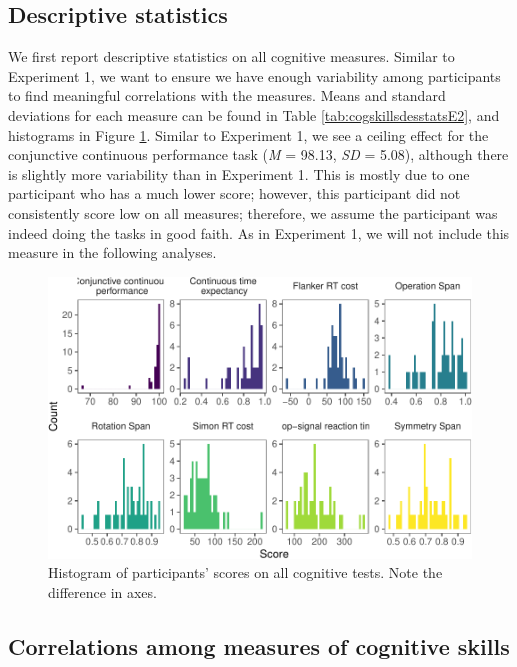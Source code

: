 \documentclass[
  man,floatsintext]{apa6}
\begin{document}
\hypertarget{descriptive-statistics-1}{%
\subsection{Descriptive statistics}\label{descriptive-statistics-1}}

We first report descriptive statistics on all cognitive measures. Similar to Experiment 1, we want to ensure we have enough variability among participants to find meaningful correlations with the measures. Means and standard deviations for each measure can be found in Table \ref{tab:cogskillsdesstatsE2}, and histograms in Figure \ref{fig:exp2hist}. Similar to Experiment 1, we see a ceiling effect for the conjunctive continuous performance task (\emph{M} = 98.13, \emph{SD} = 5.08), although there is slightly more variability than in Experiment 1. This is mostly due to one participant who has a much lower score; however, this participant did not consistently score low on all measures; therefore, we assume the participant was indeed doing the tasks in good faith. As in Experiment 1, we will not include this measure in the following analyses.



\begin{figure}
\centering
\includegraphics{task_difficulty_ind_dif_files/figure-latex/exp2hist-1.pdf}
\caption{\label{fig:exp2hist}Histogram of participants' scores on all cognitive tests. Note the difference in axes.}
\end{figure}

\hypertarget{correlations-among-measures-of-cognitive-skills-1}{%
\subsection{Correlations among measures of cognitive skills}\label{correlations-among-measures-of-cognitive-skills-1}}
\end{document}
